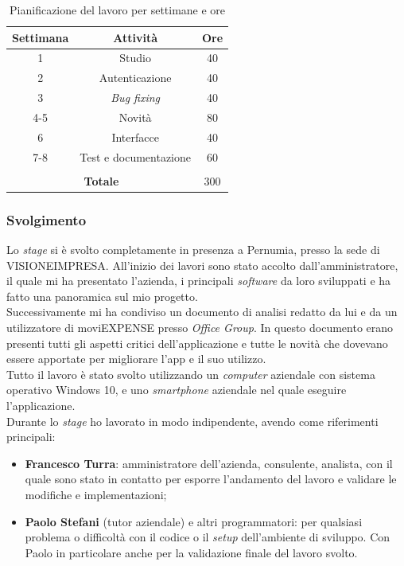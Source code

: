\renewcommand{\arraystretch}{1.3}
\begin{table}[H]
    \centering
        \begin{tabular}{| c | c | c |}
        \hline
        \textbf{Settimana} & \textbf{Attività} & \textbf{Ore} \\
        \hline
        1 & Studio & 40 \\
        \hline
        2 & Autenticazione & 40 \\
        \hline
        3 & \textit{Bug fixing} & 40 \\
        \hline
        4-5 & Novità & 80 \\
        \hline
        6 & Interfacce & 40 \\
        \hline
        7-8 & Test e documentazione & 60 \\
        \hline
        \multicolumn{3}{c}{\rule{0pt}{1em}} \\
        \hline
        \multicolumn{2}{|c|}{\textbf{Totale}} & 300 \\
        \hline
        \end{tabular}
        \caption{Pianificazione del lavoro per settimane e ore}
\end{table}
\renewcommand{\arraystretch}{1}

\subsubsection{Svolgimento}

Lo \textit{stage} si è svolto completamente in presenza a Pernumia, presso la sede di VISIONEIMPRESA. All'inizio dei lavori sono stato accolto dall'amministratore, il quale mi ha presentato l'azienda, i principali \textit{software} da loro sviluppati e ha fatto una panoramica sul mio progetto.\\
Successivamente mi ha condiviso un documento di analisi redatto da lui e da un utilizzatore di moviEXPENSE presso \textit{Office Group}. In questo documento erano presenti tutti gli aspetti critici dell'applicazione e tutte le novità che dovevano essere apportate per migliorare l'app e il suo utilizzo.\\
Tutto il lavoro è stato svolto utilizzando un \textit{computer} aziendale con sistema operativo Windows 10, e uno \textit{smartphone} aziendale nel quale eseguire l'applicazione.\\
Durante lo \textit{stage} ho lavorato in modo indipendente, avendo come riferimenti principali:
\begin{itemize}
    \item \textbf{Francesco Turra}: amministratore dell'azienda, consulente, analista, con il quale sono stato in contatto per esporre l'andamento del lavoro e validare le modifiche e implementazioni;
    \item \textbf{Paolo Stefani} (tutor aziendale) e altri programmatori: per qualsiasi problema o difficoltà con il codice o il \textit{setup} dell'ambiente di sviluppo. Con Paolo in particolare anche per la validazione finale del lavoro svolto.
\end{itemize}



